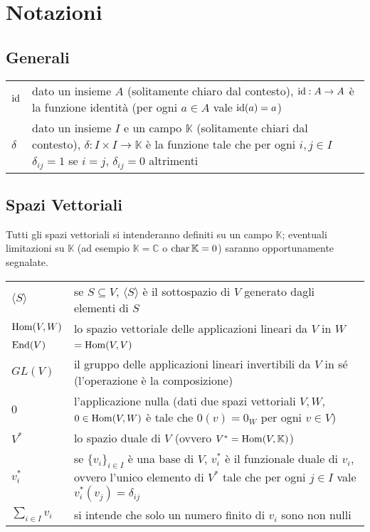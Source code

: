 \renewcommand{\arraystretch}{1.5}

\chapter{Notazioni}
\section{Generali}
\begin{tabularx}{\textwidth}{SX}
\hline
$\operatorname{id}$ & dato un insieme $A$ (solitamente chiaro dal contesto), $\operatorname{id}:A\to A$ è la funzione identità (per ogni $a\in A$ vale $\operatorname{id}(a)=a$)\\
$\delta$ & dato un insieme $I$ e un campo $\mathbb{K}$ (solitamente chiari dal contesto), $\delta:I\times I\to\mathbb{K}$ è la funzione tale che per ogni $i,j\in I$ $\delta_{ij}=1$ se $i=j$, $\delta_{ij}=0$ altrimenti \\
\hline
\end{tabularx}
\section{Spazi Vettoriali}
Tutti gli spazi vettoriali si intenderanno definiti su un campo $\mathbb{K}$; eventuali limitazioni su $\mathbb{K}$ (ad esempio $\mathbb{K}=\mathbb{C}$ o $\operatorname{char}\mathbb{K}=0$) saranno opportunamente segnalate.\\
\begin{tabularx}{\textwidth}{SX}
\hline
$\langle S\rangle$ & se $S\subseteq V$, $\langle S\rangle$ è il sottospazio di $V$ generato dagli elementi di $S$ \\
$\operatorname{Hom}(V,W)$ & lo spazio vettoriale delle applicazioni lineari da $V$ in $W$\\
$\operatorname{End}(V)$ & $=\operatorname{Hom}(V,V)$ \\
$GL(V)$ & il gruppo delle applicazioni lineari invertibili da $V$ in sé (l'operazione è la composizione) \\
0 & l'applicazione nulla (dati due spazi vettoriali $V\comma W$, $0\in\operatorname{Hom}(V,W)$ è tale che $0(v)=0_W$ per ogni $v\in V$) \\
$V^*$ & lo spazio duale di $V$ (ovvero $V^*=\operatorname{Hom}(V,\mathbb{K})$) \\
$v_i^*$ & se $\{v_i\}_{i\in I}$ è una base di $V$, $v_i^*$ è il funzionale duale di $v_i$, ovvero l'unico elemento di $V^*$ tale che per ogni $j\in I$ vale $v_i^*(v_{j})=\delta_{ij}$\\
$\sum_{i\in I}v_i$ & si intende che solo un numero finito di $v_i$ sono non nulli\\
\hline
\end{tabularx}
